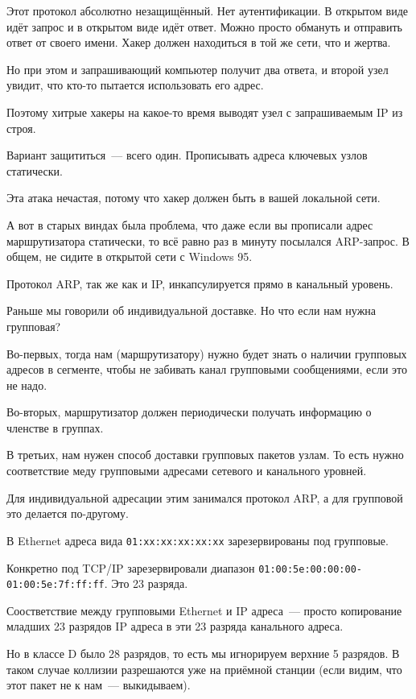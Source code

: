 Этот протокол абсолютно незащищённый. Нет аутентификации. В открытом виде идёт запрос и в открытом виде идёт ответ. Можно просто обмануть и отправить ответ от своего имени. Хакер должен находиться в той же сети, что и жертва. 

Но при этом и запрашивающий компьютер получит два ответа, и второй узел увидит, что кто-то пытается использовать его адрес.

Поэтому хитрые хакеры на какое-то время выводят узел с запрашиваемым IP из строя.

Вариант защититься~--- всего один. Прописывать адреса ключевых узлов статически.

Эта атака нечастая, потому что хакер должен быть в вашей локальной сети.

А вот в старых виндах была проблема, что даже если вы прописали адрес маршрутизатора статически, то всё равно раз в минуту посылался ARP-запрос. В общем, не сидите в открытой сети с Windows 95.

Протокол ARP, так же как и IP, инкапсулируется прямо в канальный уровень.


Раньше мы говорили об индивидуальной доставке. Но что если нам нужна групповая?

Во-первых, тогда нам (маршрутизатору) нужно будет знать о наличии групповых адресов в сегменте, чтобы не забивать канал групповыми сообщениями, если это не надо.

Во-вторых, маршрутизатор должен периодически получать информацию о членстве в группах.

В третьих, нам нужен способ доставки групповых пакетов узлам. То есть нужно соответствие меду групповыми адресами сетевого и канального уровней.

Для индивидуальной адресации этим занимался протокол ARP, а для групповой это делается по-другому. 

В Ethernet адреса вида {\tt 01:xx:xx:xx:xx:xx} зарезервированы под групповые.

Конкретно под TCP/IP зарезервировали диапазон {\tt 01:00:5e:00:00:00-01:00:5e:7f:ff:ff}. Это 23 разряда.

Соостветствие между групповыми Ethernet и IP адреса~--- просто копирование младших 23 разрядов IP адреса в эти 23 разряда канального адреса.

Но в классе D было 28 разрядов, то есть мы игнорируем верхние 5 разрядов. В таком случае коллизии разрешаются уже на приёмной станции (если видим, что этот пакет не к нам~--- выкидываем).

